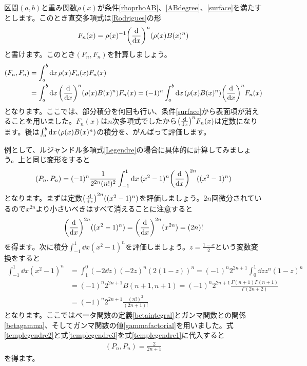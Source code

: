 \documentclass[report,paper=a4, fontsize=12pt, line_length=16cm, number_of_lines=33,dvipdfmx]{jlreq}
\numberwithin{equation}{section}
\begin{document}
区間$(a,b)$と重み関数$\rho(x)$が条件\eqref{rhoprhoAB}、\eqref{ABdegree}、\eqref{surface}を満たすとします。このとき直交多項式は\eqref{Rodrigues}の形
\begin{align}
  F_n(x)=\rho(x)^{-1}\qty(\dv{x})^n\qty(\rho(x)B(x)^n)
\end{align}
と書けます。このとき$(F_n,F_n)$を計算しましょう。
\begin{align}
  (F_n,F_n)
  &=\int_{a}^{b}\dd{x}\rho(x)F_n(x)F_n(x)\nonumber\\
  &=\int_{a}^{b}\dd{x}\qty(\dv{x})^n\qty(\rho(x)B(x)^n) F_n(x)
  =(-1)^n\int_{a}^{b}\dd{x}\qty(\rho(x)B(x)^n) \qty(\dv{x})^n F_n(x)
\end{align}
となります。ここでは、部分積分を何回も行い、条件\eqref{surface}から表面項が消えることを用いました。$F_n(x)$は$n$次多項式でしたから$\qty(\dv{x})^n F_n(x)$は定数になります。後は$\int_{a}^{b}\dd{x}\qty(\rho(x)B(x)^n)$の積分を、がんばって評価します。

例として、ルジャンドル多項式\eqref{Legendre}の場合に具体的に計算してみましょう。上と同じ変形をすると
\begin{align}
  (P_n,P_n)=(-1)^n\frac{1}{2^{2n} (n!)^2}\int_{-1}^{1}\dd{x}(x^2-1)^n\qty(\dv{x})^{2n}((x^2-1)^n)\label{templegendre1}
\end{align}
となります。まずは定数$\qty(\dv{x})^{2n}((x^2-1)^n)$を評価しましょう。$2n$回微分されているので$x^{2n}$より小さいべきはすべて消えることに注意すると
\begin{align}
  \qty(\dv{x})^{2n}((x^2-1)^n)=\qty(\dv{x})^{2n}(x^{2n})=(2n)!\label{templegendre2}
\end{align}
を得ます。次に積分$\int_{-1}^{1}\dd{x}(x^2-1)^n$を評価しましょう。$z=\frac{1-x}{2}$という変数変換をすると
\begin{align}
  \int_{-1}^{1}\dd{x}(x^2-1)^n
  &=\int_{1}^{0}(-2\dd{z})(-2z)^n(2(1-z))^n
  =(-1)^n2^{2n+1} \int_{0}^{1}\dd{z}z^n(1-z)^n\nonumber\\
  &=(-1)^n2^{2n+1} B(n+1,n+1)
  =(-1)^n2^{2n+1} \frac{\Gamma(n+1)\Gamma(n+1)}{\Gamma(2n+2)}\nonumber\\
  &=(-1)^n2^{2n+1} \frac{(n!)^2}{(2n+1)!}\label{templegendre3}
\end{align}
となります。ここではベータ関数の定義\eqref{betaintegral}とガンマ関数との関係\eqref{betagamma}、そしてガンマ関数の値\eqref{gammafactorial}を用いました。式\eqref{templegendre2}と式\eqref{templegendre3}を式\eqref{templegendre1}に代入すると
\begin{align}
  (P_n,P_n)=\frac{2}{2n+1}
\end{align}
を得ます。
\end{document}
